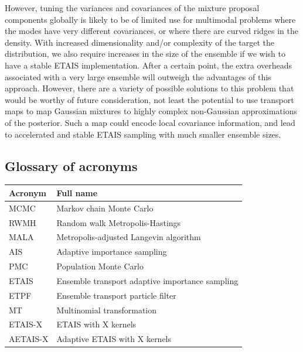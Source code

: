 \documentclass[final]{siamltex}
\begin{document}
However, tuning the variances and
covariances of the mixture proposal components
globally is likely to be of limited use for multimodal problems where
the modes have very different covariances, or where there are curved
ridges in the density. {\red With increased dimensionality and/or
  complexity of the target the distribution, we also require increases
  in the size of the ensemble if we wish to have a stable ETAIS
  implementation. After a certain point, the extra overheads
  associated with a very large ensemble will outweigh the advantages
  of this approach. However, there} are a variety of possible solutions to
this problem that would be worthy of future consideration, not least
the potential to use transport maps\cite{el2012bayesian,parno2014transport} to map Gaussian mixtures to
highly complex non-Gaussian approximations of the posterior. Such a
map could encode local covariance information, and lead to accelerated
and stable ETAIS sampling {\red with much smaller ensemble sizes}.

\begin{appendix}

\section{Glossary of acronyms}

\begin{table}[h!]
\centering
\begin{tabular}{|l|l|}
\hline
Acronym & Full name                              \\ \hline
MCMC    & Markov chain Monte Carlo               \\
RWMH    & Random walk Metropolis-Hastings        \\
MALA    & Metropolis-adjusted Langevin algorithm \\
AIS     & Adaptive importance sampling           \\
PMC     & Population Monte Carlo                 \\
ETAIS    & Ensemble transport adaptive importance sampling  \\
ETPF    & Ensemble transport particle filter     \\
MT     & Multinomial transformation      \\
ETAIS-X  & ETAIS with X kernels                    \\
AETAIS-X & Adaptive ETAIS with X kernels          \\ \hline
\end{tabular}
\end{table}

\end{appendix}



\end{document}
